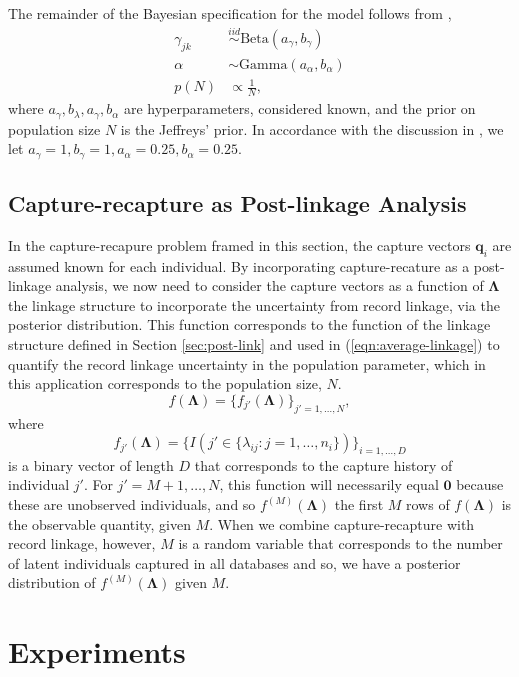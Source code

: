 \documentclass[11pt]{article}
\begin{document}
The remainder of the Bayesian specification for the model follows from \citep{manrique2016bayesian},
\begin{align*}
\gamma_{jk} &\stackrel{iid}{\sim} \text{Beta}(a_\gamma, b_\gamma) \\
\alpha &\sim \text{Gamma}(a_\alpha, b_\alpha) \\
p(N) &\propto \frac{1}{N},
\end{align*}
where $a_\gamma, b_\lambda, a_\gamma, b_\alpha$ are hyperparameters, considered known, and the prior on population size $N$ is the Jeffreys' prior. In accordance with the discussion in \citep{manrique2016bayesian}, we let $a_\gamma = 1, b_\gamma = 1, a_\alpha = 0.25, b_\alpha = 0.25$.

\subsection{Capture-recapture as Post-linkage Analysis}
\label{sec:gen-post-link}

In the capture-recapure problem framed in this section, the capture vectors $\boldsymbol q_i$ are assumed known for each individual. By incorporating capture-recature as a post-linkage analysis, we now need to consider the capture vectors as a function of $\bm \Lambda$ the linkage structure to incorporate the uncertainty from record linkage, via the posterior distribution. This function corresponds to the function of the linkage structure defined in Section \ref{sec:post-link} and used in (\ref{eqn:average-linkage}) to quantify the record linkage uncertainty in the population parameter, which in this application corresponds to the population size, $N$.
$$
f(\bm \Lambda) = \{f_{j'}(\bm \Lambda)\}_{j' = 1, \dots, N},
$$
where
$$
f_{j'}(\bm \Lambda) = \{I(j' \in \{\lambda_{ij}:j = 1, \dots, n_i\})\}_{i = 1, \dots, D}
$$
is a binary vector of length $D$ that corresponds to the capture history of individual $j'$. For $j' = M + 1, \dots, N$, this function will necessarily equal $\boldsymbol 0$ because these are unobserved individuals, and so $f^{(M)}(\bm \Lambda)$ the first $M$ rows of $f(\bm \Lambda)$ is the observable quantity, given $M$. When we combine capture-recapture with record linkage, however, $M$ is a random variable that corresponds to the number of latent individuals captured in all databases and so, we have a posterior distribution of $f^{(M)}(\bm \Lambda)$ given $M$.


\section{Experiments}
\label{sec:experiments}
\end{document}
